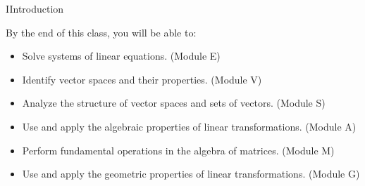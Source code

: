 \begin{module}{I}{Introduction}
\begin{applicationActivities}{1}{1}
\begin{remark}
  By the end of this class, you will be able to:
  \begin{itemize}
  \item Solve systems of linear equations.
        (Module E)
  \item Identify vector spaces and their properties.
        (Module V)
  \item Analyze the structure of vector spaces and sets of vectors.
        (Module S)
  \item Use and apply the algebraic properties of linear transformations.
        (Module A)
  \item Perform fundamental operations in the algebra of matrices.
        (Module M)
  \item Use and apply the geometric properties of linear transformations.
        (Module G)
  \end{itemize}
\end{remark}

\end{applicationActivities}
\end{module}
